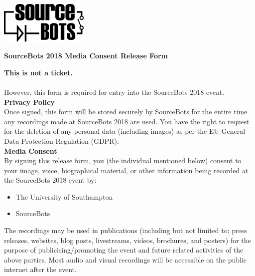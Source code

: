 \documentclass[a4paper]{article}
\begin{document}
\newcommand{\eventyear}{2018\xspace}
\newcommand{\event}{SourceBots \eventyear}

\begin{minipage}[c]{0.30\textwidth}
\includegraphics[height=2cm]{fig-SourceBots}
\end{minipage}
\hspace{0.03\textwidth}
\begin{minipage}[c]{0.67\textwidth}
\begin{center}
{\large \textbf{\event Media Consent Release Form} \par}
\end{center}
\end{minipage}
\vspace{1cm}

\textbf{This is not a ticket.}\\\\ However, this form is required for entry into the \event event.\\

\vspace{0.3cm}
\textbf{\large Privacy Policy}\\

Once signed, this form will be stored securely by SourceBots for the entire time any recordings made at \event are used. You have the right to request for the deletion of any personal data (including images) as per the EU General Data Protection Regulation (GDPR).\\

\vspace{0.3cm}
\textbf{\large Media Consent}\\

By signing this release form, you (the individual mentioned below) consent to your image, voice, biographical material, or other information being recorded at the \event event by:
\begin{itemize}
    \item The University of Southampton
    \item SourceBots
\end{itemize}
 The recordings may be used in publications (including but not limited to; press releases, websites, blog posts, livestreams, videos, brochures, and posters) for the purpose of publicising/promoting the event and future related activities of the above parties. Most audio and visual recordings will be accessible on the public internet after the event.
\end{document}
